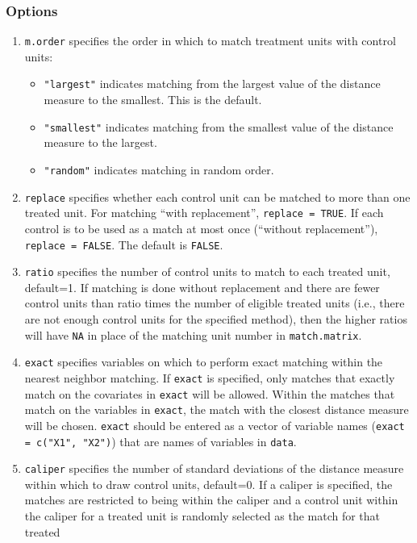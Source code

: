 \documentclass[oneside,letterpaper,titlepage]{article}
\begin{document}
\subsubsection{Options}
\begin{enumerate}
\item \texttt{m.order}  specifies the order in which to match
  treatment units with control units:
  \begin{itemize}
  \item {\tt "largest"} indicates matching from the largest value of
    the distance measure to the smallest. This is the default.
  \item {\tt "smallest"} indicates matching from the smallest value of
    the distance measure to the largest.
  \item {\tt "random"} indicates matching in random order.
  \end{itemize}
\item \texttt{replace} specifies whether each control unit can be
  matched to more than one treated unit.  For matching ``with
  replacement'', \texttt{replace = TRUE}.  If each control is to be
  used as a match at most once (``without replacement''), \texttt{replace
    = FALSE}. The default is {\tt FALSE}.
\item \texttt{ratio} specifies the number of control units to match to
  each treated unit, default=1.  If matching is done without
  replacement and there are fewer control units than ratio times the
  number of eligible treated units (i.e., there are not enough control 
  units for the specified method), then the higher ratios will have
  \texttt{NA} in place of the matching unit number in
  \texttt{match.matrix}.
\item \texttt{exact} specifies variables on which to perform exact
  matching within the nearest neighbor matching.  If \texttt{exact} is
  specified, only matches that exactly match on the covariates in
  \texttt{exact} will be allowed.  Within the matches that match on
  the variables in \texttt{exact}, the match with the closest distance
  measure will be chosen.  \texttt{exact} should be entered as a
  vector of variable names (\texttt{exact = c("X1", "X2")}) that are
  names of variables in \texttt{data}.
\item \texttt{caliper} specifies the number of standard deviations of
  the distance measure within which to draw control units, default=0.
  If a caliper is specified, the matches are restricted to being
  within the caliper and a control unit within the caliper for a
  treated unit is randomly selected as the match for that treated

\end{enumerate}
\end{document}
